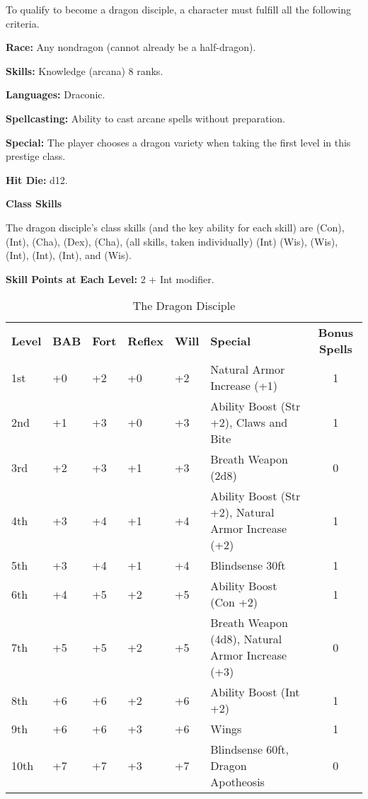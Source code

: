 
\Requirements

To qualify to become a dragon disciple, a character must fulfill all the following 
criteria.

\textbf{Race:} Any nondragon (cannot already be a half-dragon).

\textbf{Skills:} Knowledge (arcana) 8 ranks.

\textbf{Languages:} Draconic.

\textbf{Spellcasting:} Ability to cast arcane spells without preparation.

\textbf{Special:} The player chooses a dragon variety when taking the first level 
in this prestige class.

\Basics

\textbf{Hit Die:} d12.

\textbf{Class Skills}

The dragon disciple's class skills (and the key ability for each skill) are  
(Con),  (Int),  (Cha),  (Dex),  (Cha), 
 (all skills, taken individually) (Int)  (Wis),  (Wis), 
 (Int),  (Int),  (Int), and  (Wis). 

\textbf{Skill Points at Each Level:} 2 + Int modifier.

\begin{table}[htb]
\caption{The Dragon Disciple}
\centering
\begin{tabular}{*{6}{l}c}
\textbf{Level} & \textbf{BAB} & \textbf{Fort} & \textbf{Reflex} & \textbf{Will} & \textbf{Special} & \textbf{Bonus Spells} \\
1st & +0 & +2 & +0 & +2 & Natural Armor Increase (+1) & 1\\
2nd & +1 & +3 & +0 & +3 & Ability Boost (Str +2), Claws and Bite & 1\\
3rd & +2 & +3 & +1 & +3 & Breath Weapon (2d8) & 0\\
4th & +3 & +4 & +1 & +4 & Ability Boost (Str +2), Natural Armor Increase (+2) & 1\\
5th & +3 & +4 & +1 & +4 & Blindsense 30ft & 1\\
6th & +4 & +5 & +2 & +5 & Ability Boost (Con +2) & 1\\
7th & +5 & +5 & +2 & +5 & Breath Weapon (4d8), Natural Armor Increase (+3) & 0\\
8th & +6 & +6 & +2 & +6 & Ability Boost (Int +2) & 1\\
9th & +6 & +6 & +3 & +6 & Wings & 1\\
10th & +7 & +7 & +3 & +7 & Blindsense 60ft, Dragon Apotheosis & 0\\
\end{tabular}
\end{table}

